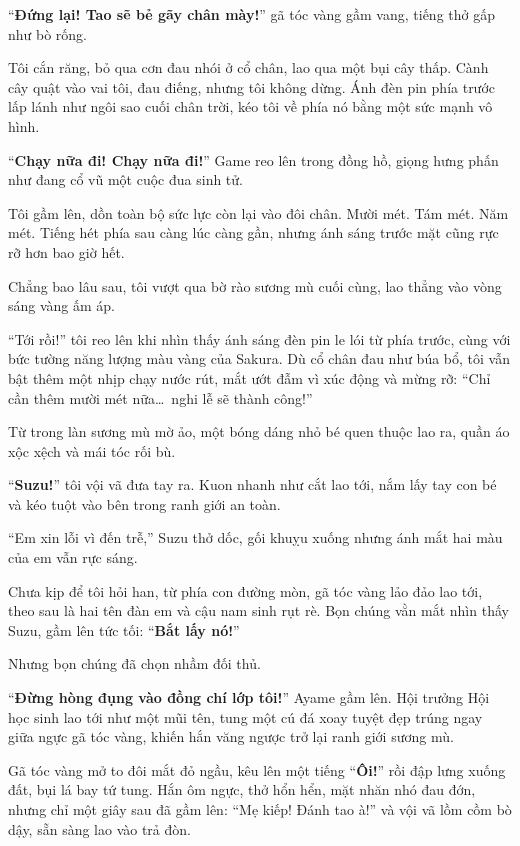 \documentclass[../main.tex]{subfiles}
\begin{document}
``\textbf{Đứng lại! Tao sẽ bẻ gãy chân mày!}'' gã tóc vàng gầm vang, tiếng thở gấp như bò rống.

Tôi cắn răng, bỏ qua cơn đau nhói ở cổ chân, lao qua một bụi cây thấp. Cành cây quật vào vai tôi, đau điếng, nhưng tôi không dừng. Ánh đèn pin phía trước lấp lánh như ngôi sao cuối chân trời, kéo tôi về phía nó bằng một sức mạnh vô hình.

``\textbf{Chạy nữa đi! Chạy nữa đi!}'' Game reo lên trong đồng hồ, giọng hưng phấn như đang cổ vũ một cuộc đua sinh tử.

Tôi gầm lên, dồn toàn bộ sức lực còn lại vào đôi chân. Mười mét. Tám mét. Năm mét. Tiếng hét phía sau càng lúc càng gần, nhưng ánh sáng trước mặt cũng rực rỡ hơn bao giờ hết.

Chẳng bao lâu sau, tôi vượt qua bờ rào sương mù cuối cùng, lao thẳng vào vòng sáng vàng ấm áp.

``Tới rồi!'' tôi reo lên khi nhìn thấy ánh sáng đèn pin le lói từ phía trước, cùng với bức tường năng lượng màu vàng của Sakura. Dù cổ chân đau như búa bổ, tôi vẫn bật thêm một nhịp chạy nước rút, mắt ướt đẫm vì xúc động và mừng rỡ: ``Chỉ cần thêm mười mét nữa\dots\ nghi lễ sẽ thành công!''


Từ trong làn sương mù mờ ảo, một bóng dáng nhỏ bé quen thuộc lao ra, quần áo xộc xệch và mái tóc rối bù.

``\textbf{Suzu!}'' tôi vội vã đưa tay ra. Kuon nhanh như cắt lao tới, nắm lấy tay con bé và kéo tuột vào bên trong ranh giới an toàn.

``Em xin lỗi vì đến trễ,'' Suzu thở dốc, gối khuỵu xuống nhưng ánh mắt hai màu của em vẫn rực sáng.

Chưa kịp để tôi hỏi han, từ phía con đường mòn, gã tóc vàng lảo đảo lao tới, theo sau là hai tên đàn em và cậu nam sinh rụt rè. Bọn chúng vằn mắt nhìn thấy Suzu, gầm lên tức tối: ``\textbf{Bắt lấy nó!}''

Nhưng bọn chúng đã chọn nhầm đối thủ.

``\textbf{Đừng hòng đụng vào đồng chí lớp tôi!}'' Ayame gầm lên. Hội trưởng Hội học sinh lao tới như một mũi tên, tung một cú đá xoay tuyệt đẹp trúng ngay giữa ngực gã tóc vàng, khiến hắn văng ngược trở lại ranh giới sương mù.

Gã tóc vàng mở to đôi mắt đỏ ngầu, kêu lên một tiếng ``\textbf{Ôi!}'' rồi đập lưng xuống đất, bụi lá bay tứ tung. Hắn ôm ngực, thở hổn hển, mặt nhăn nhó đau đớn, nhưng chỉ một giây sau đã gầm lên: ``Mẹ kiếp! Đánh tao à!'' và vội vã lồm cồm bò dậy, sẵn sàng lao vào trả đòn.
\end{document}
